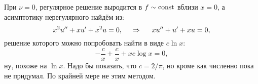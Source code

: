 При $\nu = 0$, регулярное решение выродится в $f \sim \textnormal{const}$ вблизи $x=0$, а асимптотику нерегулярного найдём из:
\begin{equation*}
    x^2 u'' + x u' + x^2 u = 0,
    \hspace{0.5cm} \Rightarrow \hspace{0.5cm}
    x u'' + u' + x u = 0,
\end{equation*}
решение которого можно попробовать найти в виде $c \ln x$:
\begin{equation*}
    -\frac{c}{x} + \frac{c}{x} + x c \log x = 0,
\end{equation*}
ну, похоже на $\ln x$. Надо бы показать, что $c = 2 / \pi$, но кроме как численно пока не придумал. По крайней мере не этим методом. 

